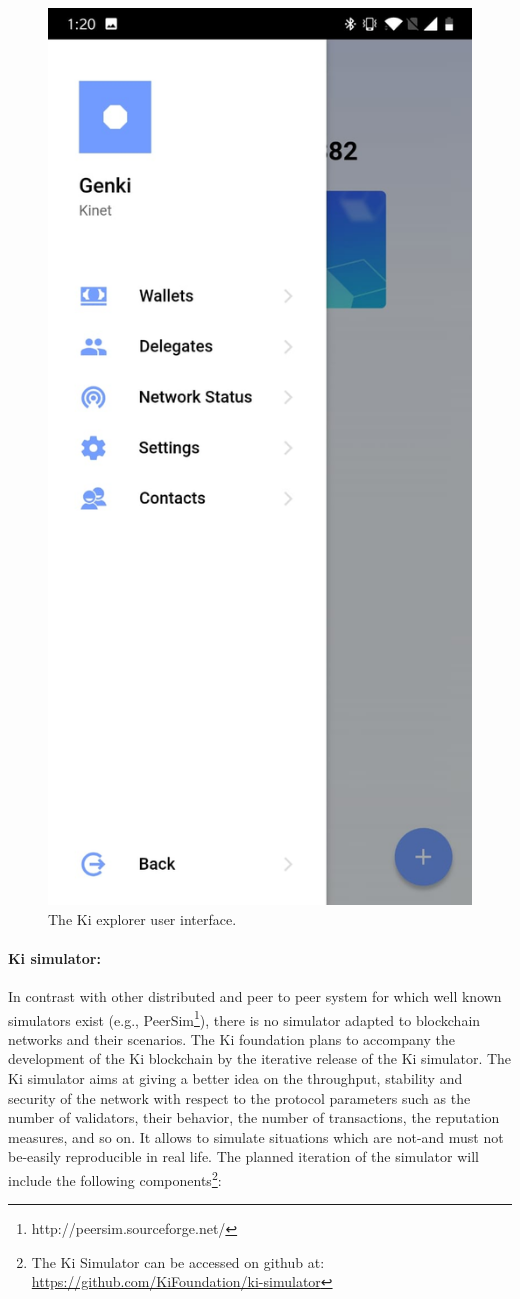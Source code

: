 \begin{figure}
	\includegraphics[width=0.32\linewidth, trim= 0cm 0cm 0cm 0cm, clip]{Figures/mw3}
	\caption{The Ki explorer user interface.}
	\label{fig:walletapp}
\end{figure}
\paragraph{Ki simulator:} In contrast with other distributed and peer to peer system for which well known simulators exist (e.g., PeerSim\footnote{http://peersim.sourceforge.net/}), there is no simulator adapted to blockchain networks and their scenarios. The Ki foundation plans to accompany the development of the Ki blockchain by the iterative release of the Ki simulator. The Ki simulator aims at giving a better idea on the throughput, stability and security of the network with respect to the protocol parameters such as the number of validators, their behavior, the number of transactions, the reputation measures, and so on. It allows to simulate situations which are not-and must not be-easily reproducible in real life. The planned iteration of the simulator will include the following components\footnote{The Ki Simulator can be accessed on github at: \url{https://github.com/KiFoundation/ki-simulator}}:

